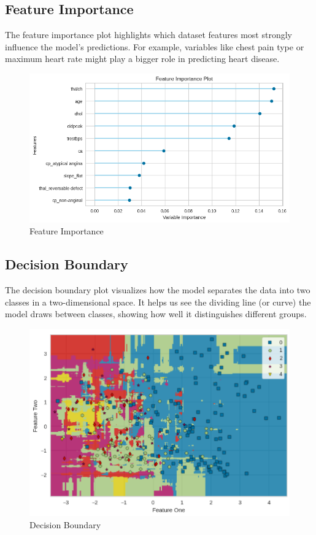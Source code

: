\documentclass[journal]{IEEEtran}
\begin{document}
\subsection{Feature Importance}
The feature importance plot highlights which dataset features most strongly influence the model’s predictions. For example, variables like chest pain type or maximum heart rate might play a bigger role in predicting heart disease.

\begin{figure}[h]
    \centering
    \includegraphics[width=1\linewidth]{images/Feature Importance.png}
    \caption{Feature Importance}
    \label{fig:feature-importance}
\end{figure}

\subsection{Decision Boundary}
The decision boundary plot visualizes how the model separates the data into two classes in a two-dimensional space. It helps us see the dividing line (or curve) the model draws between classes, showing how well it distinguishes different groups.
\begin{figure}[h]
    \centering
    \includegraphics[width=1\linewidth]{images/Decision Boundary Plot.png}
    \caption{Decision Boundary}
    \label{fig:decision-boundary}
\end{figure}
\end{document}
